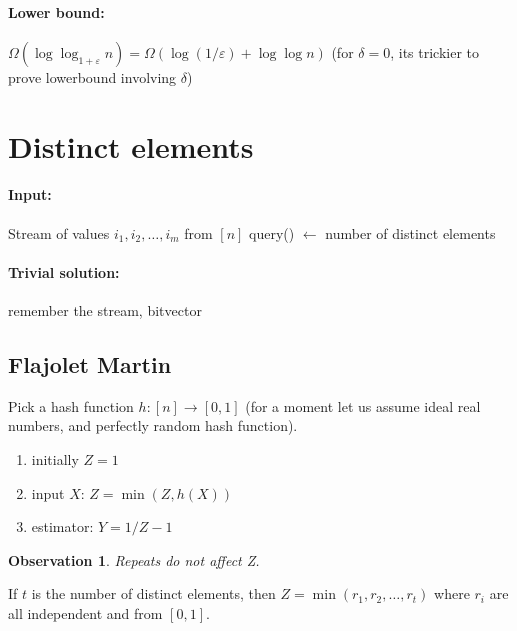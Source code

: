 \documentclass[11pt]{article}
\newtheorem{observation}[theorem]{Observation}
\begin{document}
\paragraph{Lower bound:} $\Omega(\log \log_{1+\varepsilon} n) = \Omega(\log(1/\varepsilon) + \log \log n)$ (for $\delta=0$, its trickier to prove lowerbound involving $\delta$)


\section{Distinct elements}

\paragraph{Input:} Stream of values $i_1, i_2, …, i_m$ from $[n]$
query() $\leftarrow$ number of distinct elements

\paragraph{Trivial solution:} remember the stream, bitvector
\subsection{Flajolet Martin \cite{DBLP:journals/jcss/FlajoletM85}}
Pick a hash function $h: [n] \rightarrow [0,1]$     (for a moment let us assume ideal real numbers, and perfectly random hash function).

\begin{enumerate}
\item initially $Z=1$
\item input $X$: $Z = \min(Z, h(X))$
\item estimator: $Y = 1/Z - 1$
\end{enumerate}

\begin{observation}
Repeats do not affect Z.
\end{observation}

If $t$ is the number of distinct elements, then $Z = \min(r_1, r_2, \dots, r_t)$ where $r_i$ are all independent and from $[0,1]$.
\end{document}
